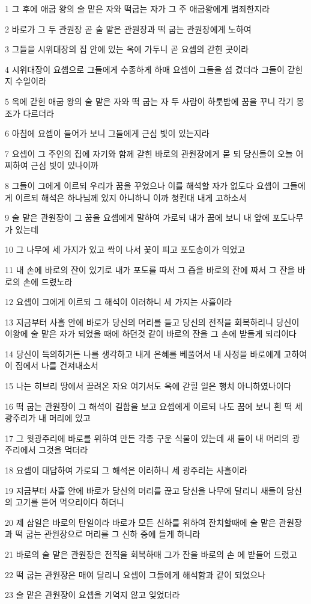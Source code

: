 \par 1 그 후에 애굽 왕의 술 맡은 자와 떡굽는 자가 그 주 애굽왕에게 범죄한지라
\par 2 바로가 그 두 관원장 곧 술 맡은 관원장과 떡 굽는 관원장에게 노하여
\par 3 그들을 시위대장의 집 안에 있는 옥에 가두니 곧 요셉의 갇힌 곳이라
\par 4 시위대장이 요셉으로 그들에게 수종하게 하매 요셉이 그들을 섬 겼더라 그들이 갇힌 지 수일이라
\par 5 옥에 갇힌 애굽 왕의 술 맡은 자와 떡 굽는 자 두 사람이 하룻밤에 꿈을 꾸니 각기 몽조가 다르더라
\par 6 아침에 요셉이 들어가 보니 그들에게 근심 빛이 있는지라
\par 7 요셉이 그 주인의 집에 자기와 함께 갇힌 바로의 관원장에게 묻 되 당신들이 오늘 어찌하여 근심 빛이 있나이까
\par 8 그들이 그에게 이르되 우리가 꿈을 꾸었으나 이를 해석할 자가 없도다 요셉이 그들에게 이르되 해석은 하나님께 있지 아니하니 이까 청컨대 내게 고하소서
\par 9 술 맡은 관원장이 그 꿈을 요셉에게 말하여 가로되 내가 꿈에 보니 내 앞에 포도나무가 있는데
\par 10 그 나무에 세 가지가 있고 싹이 나서 꽃이 피고 포도송이가 익었고
\par 11 내 손에 바로의 잔이 있기로 내가 포도를 따서 그 즙을 바로의 잔에 짜서 그 잔을 바로의 손에 드렸노라
\par 12 요셉이 그에게 이르되 그 해석이 이러하니 세 가지는 사흘이라
\par 13 지금부터 사흘 안에 바로가 당신의 머리를 들고 당신의 전직을 회복하리니 당신이 이왕에 술 맡은 자가 되었을 때에 하던것 같이 바로의 잔을 그 손에 받들게 되리이다
\par 14 당신이 득의하거든 나를 생각하고 내게 은혜를 베풀어서 내 사정을 바로에게 고하여 이 집에서 나를 건져내소서
\par 15 나는 히브리 땅에서 끌려온 자요 여기서도 옥에 갇힐 일은 행치 아니하였나이다
\par 16 떡 굽는 관원장이 그 해석이 길함을 보고 요셉에게 이르되 나도 꿈에 보니 흰 떡 세 광주리가 내 머리에 있고
\par 17 그 윗광주리에 바로를 위하여 만든 각종 구운 식물이 있는데 새 들이 내 머리의 광주리에서 그것을 먹더라
\par 18 요셉이 대답하여 가로되 그 해석은 이러하니 세 광주리는 사흘이라
\par 19 지금부터 사흘 안에 바로가 당신의 머리를 끊고 당신을 나무에 달리니 새들이 당신의 고기를 뜯어 먹으리이다 하더니
\par 20 제 삼일은 바로의 탄일이라 바로가 모든 신하를 위하여 잔치할때에 술 맡은 관원장과 떡 굽는 관원장으로 머리를 그 신하 중에 들게 하니라
\par 21 바로의 술 맡은 관원장은 전직을 회복하매 그가 잔을 바로의 손 에 받들어 드렸고
\par 22 떡 굽는 관원장은 매여 달리니 요셉이 그들에게 해석함과 같이 되었으나
\par 23 술 맡은 관원장이 요셉을 기억지 않고 잊었더라

